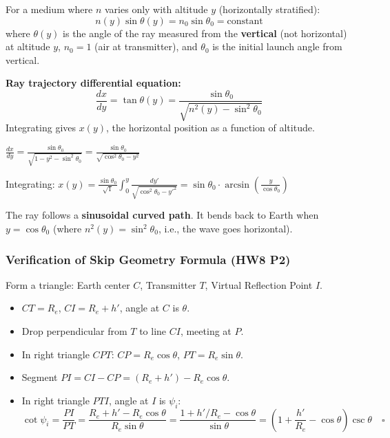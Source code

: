 \documentclass[10pt,letterpaper]{article}
\begin{document}
\begin{tcolorbox}[formulabox, title={Generalized Snell's Law}]
For a medium where $n$ varies only with altitude $y$ (horizontally stratified):
\begin{equation}
  n(y)\sin\theta(y) = n_0\sin\theta_0 = \text{constant}
\end{equation}
where $\theta(y)$ is the angle of the ray measured from the \textbf{vertical} (not horizontal) at altitude $y$, $n_0 = 1$ (air at transmitter), and $\theta_0$ is the initial launch angle from vertical.

\textbf{Ray trajectory differential equation:}
\begin{equation}
  \frac{dx}{dy} = \tan\theta(y) = \frac{\sin\theta_0}{\sqrt{n^2(y) - \sin^2\theta_0}}
\end{equation}
Integrating gives $x(y)$, the horizontal position as a function of altitude.
\end{tcolorbox}

\begin{tcolorbox}[examplebox, title={HW8 P4 Example: $n^2(y) = 1 - y^2$, Attack Angle $\theta_0$}]
$\frac{dx}{dy} = \frac{\sin\theta_0}{\sqrt{1 - y^2 - \sin^2\theta_0}} = \frac{\sin\theta_0}{\sqrt{\cos^2\theta_0 - y^2}}$

Integrating: $x(y) = \frac{\sin\theta_0}{\sqrt{1}}\int_0^y\frac{dy'}{\sqrt{\cos^2\theta_0 - y'^2}} = \sin\theta_0\cdot\arcsin\!\left(\frac{y}{\cos\theta_0}\right)$

The ray follows a \textbf{sinusoidal curved path}. It bends back to Earth when $y = \cos\theta_0$ (where $n^2(y) = \sin^2\theta_0$, i.e., the wave goes horizontal).
\end{tcolorbox}

\subsubsection{Verification of Skip Geometry Formula (HW8 P2)}

\begin{tcolorbox}[purplebox, title={Geometric Proof}]
Form a triangle: Earth center $C$, Transmitter $T$, Virtual Reflection Point $I$.
\begin{itemize}[noitemsep]
  \item $CT = R_e$, $CI = R_e + h'$, angle at $C$ is $\theta$.
  \item Drop perpendicular from $T$ to line $CI$, meeting at $P$.
  \item In right triangle $CPT$: $CP = R_e\cos\theta$, $PT = R_e\sin\theta$.
  \item Segment $PI = CI - CP = (R_e+h') - R_e\cos\theta$.
  \item In right triangle $PTI$, angle at $I$ is $\psi_i$:
    \[\cot\psi_i = \frac{PI}{PT} = \frac{R_e+h'-R_e\cos\theta}{R_e\sin\theta} = \frac{1 + h'/R_e - \cos\theta}{\sin\theta} = \left(1+\frac{h'}{R_e}-\cos\theta\right)\csc\theta \quad\square\]
\end{itemize}
\end{tcolorbox}
\end{document}
